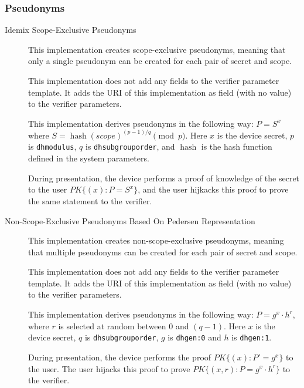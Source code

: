 \subsubsection{Pseudonyms}
    
\begin{description}
\item[Idemix Scope-Exclusive Pseudonyms]

    This implementation creates scope-exclusive pseudonyms, meaning that only
    a single pseudonym can be created for each pair of secret and scope.

    This implementation does not add any fields to the verifier
    parameter template. It adds the URI of this implementation as field
    (with no value) to the verifier parameters.

    This implementation derives pseudonyms in the following way:
    $P = S^x$ where $S=\operatorname{hash}(\textit{scope})^{(p-1)/q}\pmod{p}$.
    Here $x$ is the device secret, $p$ is \texttt{dhmodulus}, $q$ is \texttt{dhsubgrouporder},
    and $\operatorname{hash}$ is the hash function defined in the system parameters.

    During presentation, the device performs a proof of knowledge of the secret
    to the user $\mathit{PK}\lbrace(x): P = S^x\rbrace$, and the user hijkacks this proof to prove the same statement
    to the verifier.

\item[Non-Scope-Exclusive Pseudonyms Based On Pedersen Representation]

    This implementation creates non-scope-exclusive pseudonyms, meaning that multiple
    pseudonyms can be created for each pair of secret and scope.

    This implementation does not add any fields to the verifier
    parameter template. It adds the URI of this implementation as field
    (with no value) to the verifier parameters.

    This implementation derives pseudonyms in the following way:
    $P=g^x \cdot h^r$, where $r$ is selected at random between $0$ and $(q-1)$.
    Here $x$ is the device secret, $q$ is \texttt{dhsubgrouporder},
    $g$ is \texttt{dhgen:0} and $h$ is \texttt{dhgen:1}.

    During presentation, the device performs the proof $\textit{PK}\lbrace (x): P' = g^x\rbrace$
    to the user.
    The user hijacks this proof to prove $\textit{PK}\lbrace (x, r): P = g^x \cdot h^r \rbrace$
    to the verifier.
\end{description}

